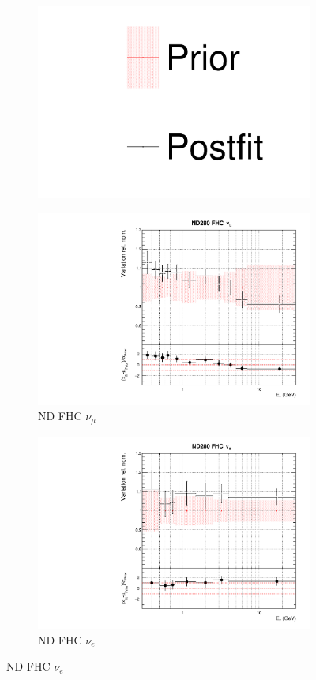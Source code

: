 \begin{figure}
\centering
\begin{subfigure}{0.95\textwidth}
  \centering
  \includegraphics[width=0.24\linewidth]{figs/dat_leg}
\end{subfigure}
\begin{subfigure}{0.24\textwidth}
  \centering
  \includegraphics[width=0.95\linewidth]{figs/datflux0}
  \caption{ND FHC $\nu_{\mu}$}
\end{subfigure}
\begin{subfigure}{0.24\textwidth}
  \centering
  \includegraphics[width=0.95\linewidth]{figs/datflux1}
  \caption{ND FHC $\nu_e$}

\end{subfigure}
\end{figure}
